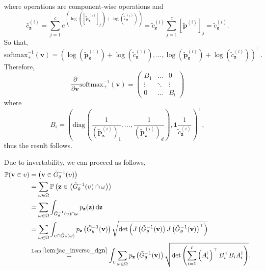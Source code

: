 \begin{tproof}
\begin{pproof}
\begin{align*}
        \end{align*}
        where operations are component-wise operations and $$\hat{c}_{\mathbf{z}}^{(i)}=\sum_{j=1}^ce^{\left(\log\left(\left[\tilde{\mathbf{p}}_{\mathbf{z}}^{(i)}\right]_j\right)+\log\left(\tilde{c}_{\mathbf{z}}^{(i)}\right)\right)}=\tilde{c}_{\mathbf{z}}^{(i)}\sum_{j=1}^c\left[\tilde{\mathbf{p}}^{(i)}\right]_j=\tilde{c}_{\mathbf{z}}^{(i)}.$$So that, $$\mathrm{softmax}_+^{-1}(\mathbf{v})=\left(\log\left(\tilde{\mathbf{p}}_{\mathbf{z}}^{(1)}\right)+\log\left(\tilde{c}_{\mathbf{z}}^{(1)}\right),\dots,\log\left(\tilde{\mathbf{p}}_{\mathbf{z}}^{(l)}\right)+\log\left(\tilde{c}_{\mathbf{z}}^{(l)}\right)\right)^\top.$$Therefore, $$\frac{\partial}{\partial\mathbf{v}}\mathrm{softmax}^{-1}_+(\mathbf{v})=\begin{pmatrix}B_1&\dots&0\\\vdots&\ddots&\vdots\\0&\dots&B_l\end{pmatrix}$$where$$B_i=\left(\mathrm{diag}\left(\frac{1}{\left(\tilde{\mathbf{p}}^{(i)}_{\mathbf{z}}\right)_1},\dots,\frac{1}{\left(\tilde{\mathbf{p}}^{(i)}_{\mathbf{z}}\right)_d}\right),\mathbf{1}\frac{1}{\tilde{c}_{\mathbf{z}}^{(i)}}\right)^\top,$$thus the result follows.
    \end{pproof}

    Due to invertability, we can proceed as follows,
    \begin{align*}
        \mathbb{P}(\mathbf{v}\in\upsilon)&=\left(\mathbf{v}\in\tilde{G}_{\theta}^{-1}(\upsilon)\right)\\&=\sum_{\omega\in\Omega}\mathbb{P}\left(\mathbf{z}\in\left(\tilde{G}_{\theta}^{-1}(\upsilon)\cap\omega\right)\right)\\&=\sum_{\omega\in\Omega}\int_{\tilde{G}_{\theta}^{-1}(\upsilon)\cap\omega}p_{\mathbf{z}}(\mathbf{z})\,\mathrm{d}\mathbf{z}\\&=\sum_{\omega\in\Omega}\int_{\upsilon\cap\tilde{G}_{\theta}(\omega)}p_{\mathbf{z}}\left(\tilde{G}_{\theta}^{-1}(\mathbf{v})\right)\sqrt{\det\left(J\left(\tilde{G}^{-1}_{\theta}(\mathbf{v})\right)J\left(\tilde{G}_{\theta}^{-1}(\mathbf{v})\right)^\top\right)}\\&\overset{\text{Lem }\ref{lem:jac_inverse_dgn}}{=}\int_{\upsilon}\sum_{\omega\in\Omega}p_{\mathbf{z}}\left(\tilde{G}_{\theta}^{-1}(\mathbf{v})\right)\sqrt{\det\left(\sum_{i=1}^l\left(A^{\dagger}_i\right)^\top B_i^\top B_iA_i^{\dagger}\right)}.
    \end{align*}
    
\end{tproof}

